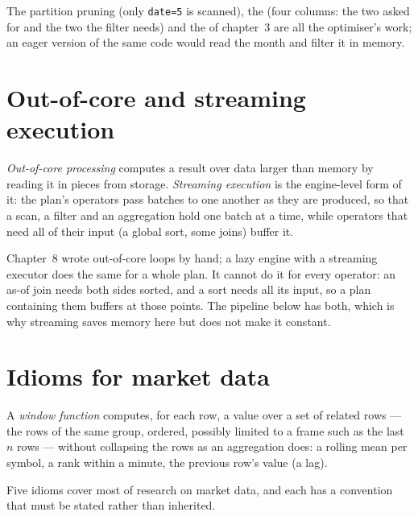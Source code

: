 The partition pruning (only \texttt{date=5} is scanned), the  (four columns: the two asked for and the two the filter
needs) and the  of chapter~3 are all the optimiser's work; an eager version of the same code would read the month and
filter it in memory.

\section{Out-of-core and streaming execution}

\begin{definition}\label{def:pl:dataframes:outofcore}
\emph{Out-of-core processing} computes a result over data larger than memory by reading it in pieces
from storage. \emph{Streaming execution} is the engine-level form of it: the plan's operators pass batches
to one another as they are produced, so that a scan, a filter and an aggregation hold one batch at a time, while operators that need
all of their input (a global sort, some joins) buffer it.
\end{definition}

Chapter~8 wrote out-of-core loops by hand; a lazy engine with a streaming executor does the same for a whole plan. It cannot do it
for every operator: an as-of join needs both sides sorted, and a sort needs all its input, so a plan containing them buffers at those
points. The pipeline below has both, which is why streaming saves memory here but does not make it constant.

\section{Idioms for market data}

\begin{definition}\label{def:pl:dataframes:window}
A \emph{window function} computes, for each row, a value over a set of related rows --- the rows of the same
group, ordered, possibly limited to a frame such as the last $n$ rows --- without collapsing the rows as an aggregation does:
a rolling mean per symbol, a rank within a minute, the previous row's value (a lag).
\end{definition}

Five idioms cover most of research on market data, and each has a convention that must be stated rather than inherited.

